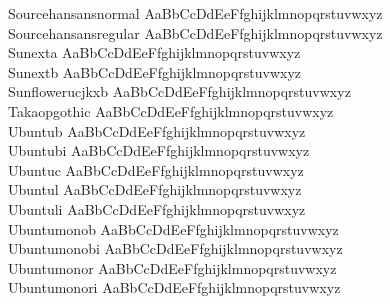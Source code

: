 \begin{tabbing}
Sourcehansansnormal \> { AaBbCcDdEeFfghijklmnopqrstuvwxyz} \\
Sourcehansansregular \> { AaBbCcDdEeFfghijklmnopqrstuvwxyz} \\
Sunexta \> { AaBbCcDdEeFfghijklmnopqrstuvwxyz} \\
Sunextb \> { AaBbCcDdEeFfghijklmnopqrstuvwxyz} \\
Sunflowerucjkxb \> { AaBbCcDdEeFfghijklmnopqrstuvwxyz} \\
Takaopgothic \> { AaBbCcDdEeFfghijklmnopqrstuvwxyz} \\
Ubuntub \> { AaBbCcDdEeFfghijklmnopqrstuvwxyz} \\
Ubuntubi \> { AaBbCcDdEeFfghijklmnopqrstuvwxyz} \\
Ubuntuc \> { AaBbCcDdEeFfghijklmnopqrstuvwxyz} \\
Ubuntul \> { AaBbCcDdEeFfghijklmnopqrstuvwxyz} \\
Ubuntuli \> { AaBbCcDdEeFfghijklmnopqrstuvwxyz} \\
Ubuntumonob \> { AaBbCcDdEeFfghijklmnopqrstuvwxyz} \\
Ubuntumonobi \> { AaBbCcDdEeFfghijklmnopqrstuvwxyz} \\
Ubuntumonor \> { AaBbCcDdEeFfghijklmnopqrstuvwxyz} \\
Ubuntumonori \> { AaBbCcDdEeFfghijklmnopqrstuvwxyz} \\

\end{tabbing}
